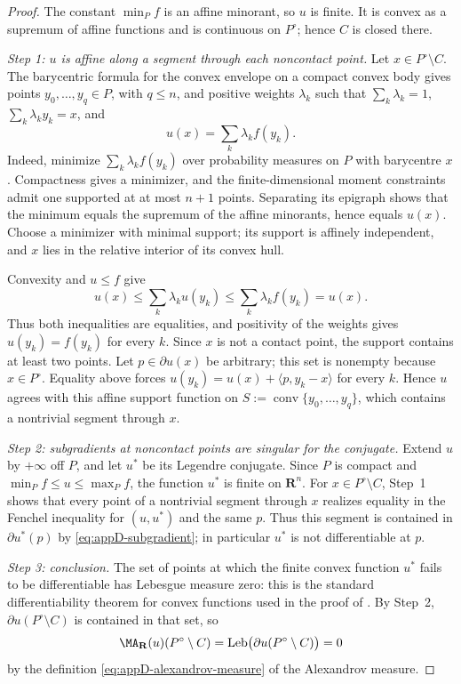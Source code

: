 \begin{proof}
The constant \(\min_Pf\) is an affine minorant, so \(u\) is finite.  It is
convex as a supremum of affine functions and is continuous on \(P^\circ\);
hence \(C\) is closed there.

\emph{Step 1: \(u\) is affine along a segment through each noncontact
point.}  Let \(x\in P^\circ\setminus C\).  The barycentric formula for the
convex envelope on a compact convex body gives points
\(y_0,\ldots,y_q\in P\), with \(q\leq n\), and positive weights
\(\lambda_k\) such that
\(\sum_k\lambda_k=1\), \(\sum_k\lambda_ky_k=x\), and
\begin{equation}\label{eq:ch23-caratheodory}
                         u(x)=\sum_k\lambda_kf(y_k).
\end{equation}
Indeed, minimize \(\sum_k\lambda_kf(y_k)\) over probability measures on
\(P\) with barycentre \(x\).  Compactness gives a minimizer, and the
finite-dimensional moment constraints admit one supported at at most
\(n+1\) points.  Separating its epigraph shows that the minimum equals the
supremum of the affine minorants, hence equals \(u(x)\).  Choose a minimizer
with minimal support; its support is affinely independent, and \(x\) lies in
the relative interior of its convex hull.

Convexity and \(u\leq f\) give
\[
 u(x)\leq\sum_k\lambda_ku(y_k)
       \leq\sum_k\lambda_kf(y_k)=u(x).
\]
Thus both inequalities are equalities, and positivity of the weights gives
\(u(y_k)=f(y_k)\) for every \(k\).  Since \(x\) is not a contact point, the
support contains at least two points.  Let \(p\in\partial u(x)\) be
arbitrary; this set is nonempty because \(x\in P^\circ\).  Equality above forces
\(u(y_k)=u(x)+\langle p,y_k-x\rangle\) for every \(k\).  Hence \(u\) agrees
with this affine support function on
\(S:=\operatorname{conv}\{y_0,\ldots,y_q\}\), which contains a nontrivial
segment through \(x\).

\emph{Step 2: subgradients at noncontact points are singular for the
conjugate.}  Extend \(u\) by \(+\infty\) off \(P\), and let \(u^*\) be its
Legendre conjugate.  Since \(P\) is compact and
\(\min_Pf\leq u\leq\max_Pf\), the function \(u^*\) is finite on
\(\mathbf R^n\).  For \(x\in P^\circ\setminus C\), Step~1 shows that every
point of a nontrivial segment through \(x\) realizes equality in the
Fenchel inequality for \((u,u^*)\) and the same \(p\).  Thus this segment is
contained in \(\partial u^*(p)\) by
\eqref{eq:appD-subgradient}; in particular \(u^*\) is not differentiable at
\(p\).

\emph{Step 3: conclusion.}  The set of points at which the finite convex
function \(u^*\) fails to be differentiable has Lebesgue measure zero: this
is the standard differentiability theorem for convex functions used in the
proof of .  By Step~2,
\(\partial u(P^\circ\setminus C)\) is contained in that set, so
\[
 \MA_{\mathbf R}(u)(P^\circ\setminus C)
 =\operatorname{Leb}\bigl(\partial u(P^\circ\setminus C)\bigr)=0
\]
by the definition \eqref{eq:appD-alexandrov-measure} of the Alexandrov
measure.
\end{proof}

